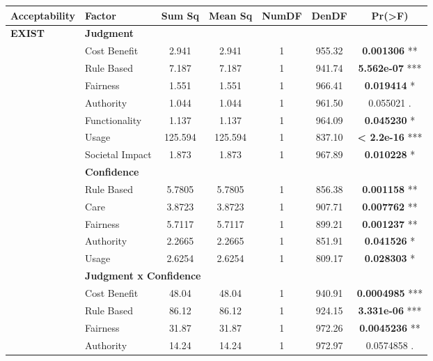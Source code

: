 \begin{table}[!hptb]
    \begin{center}
    \small
    \begin{tabular}{@{}llccccc@{}}
        \toprule
        \textbf{Acceptability} & \textbf{Factor} & \textbf{Sum Sq} & \textbf{Mean Sq} & \textbf{NumDF} & \textbf{DenDF} & \textbf{Pr(>F)} \\ 
        \midrule
        \multirow{16}{*}{\textbf{EXIST}} & \multicolumn{5}{l}{\textbf{Judgment}} \\ 
        & \quad Cost Benefit & 2.941 & 2.941 & 1 & 955.32 & \textbf{0.001306} ** \\ 
        & \quad Rule Based & 7.187 & 7.187 & 1 & 941.74 & \textbf{5.562e-07} *** \\ 
        & \quad Fairness & 1.551 & 1.551 & 1 & 966.41 & \textbf{0.019414} * \\ 
        & \quad Authority & 1.044 & 1.044 & 1 & 961.50 & 0.055021 . \\ 
        & \quad Functionality & 1.137 & 1.137 & 1 & 964.09 & \textbf{0.045230} * \\ 
        & \quad Usage & 125.594 & 125.594 & 1 & 837.10 & \textbf{< 2.2e-16} *** \\ 
        & \quad Societal Impact & 1.873 & 1.873 & 1 & 967.89 & \textbf{0.010228} * \\ 
        & \multicolumn{5}{l}{\textbf{Confidence}} \\
        & \quad Rule Based & 5.7805 & 5.7805 & 1 & 856.38 & \textbf{0.001158} ** \\ 
        & \quad Care & 3.8723 & 3.8723 & 1 & 907.71 & \textbf{0.007762} ** \\ 
        & \quad Fairness & 5.7117 & 5.7117 & 1 & 899.21 & \textbf{0.001237} ** \\ 
        & \quad Authority & 2.2665 & 2.2665 & 1 & 851.91 & \textbf{0.041526} * \\ 
        & \quad Usage & 2.6254 & 2.6254 & 1 & 809.17 & \textbf{0.028303} * \\ 
        & \multicolumn{5}{l}{\textbf{Judgment x Confidence}} \\
        & \quad Cost Benefit & 48.04 & 48.04 & 1 & 940.91 & \textbf{0.0004985} *** \\ 
        & \quad Rule Based & 86.12 & 86.12 & 1 & 924.15 & \textbf{3.331e-06} *** \\
        & \quad Fairness & 31.87 & 31.87 & 1 & 972.26 & \textbf{0.0045236} ** \\
        & \quad Authority & 14.24 & 14.24 & 1 & 972.97 & 0.0574858 . \\ 

\end{tabular}
\end{center}
\end{table}
